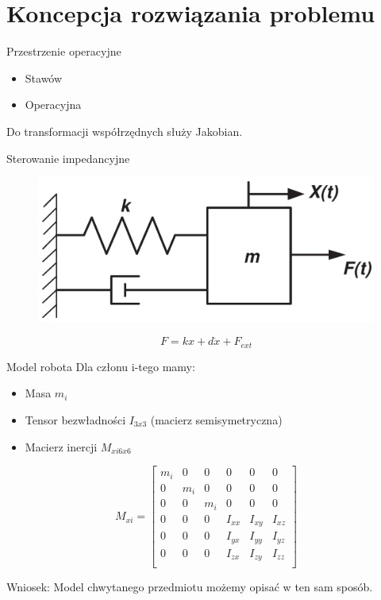 \documentclass{beamer}
\begin{document}
\section{Koncepcja rozwiązania problemu}
\begin{frame}{Przestrzenie operacyjne}
\begin{itemize}
	\item Stawów
	\item Operacyjna
\end{itemize}

Do transformacji współrzędnych służy Jakobian.
\end{frame}

\begin{frame}{Sterowanie impedancyjne}
	\begin{figure}[h]
		\centering
		\includegraphics[scale=1.30]{mds}
	\end{figure}

\begin{equation}
F = kx + d\dot{x} + F_{ext}
\end{equation}
\end{frame}

\begin{frame}{Model robota}
Dla członu i-tego mamy:
\begin{itemize}
	\item Masa $m_i$
	\item Tensor bezwładności $I_{3x3}$ (macierz semisymetryczna)
	\item Macierz inercji $M_{xi 6x6}$
\end{itemize}
\begin{equation}
M_{xi}=
\begin{bmatrix}
m_i & 0 & 0 & 0 & 0 & 0 \\
0 & m_i & 0 & 0 & 0 & 0 \\
0 & 0 & m_i & 0 & 0 & 0 \\
0 & 0 & 0 & I_{xx} & I_{xy} & I_{xz} \\
0 & 0 & 0 & I_{yx} & I_{yy} & I_{yz} \\
0 & 0 & 0 & I_{zx} & I_{zy} & I_{zz} \\

\end{bmatrix}
\end{equation}

Wniosek: Model chwytanego przedmiotu możemy opisać w ten sam sposób.
\end{frame}
\end{document}
